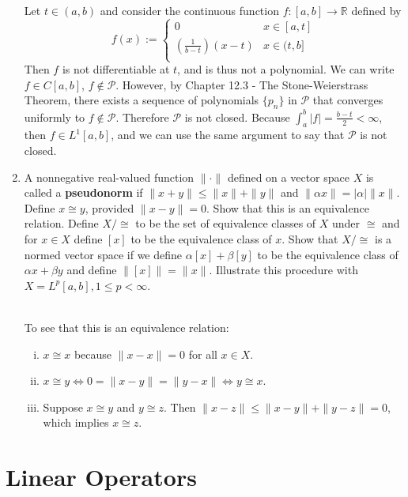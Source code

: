 \begin{enumerate}
    Let $t\in(a,b)$ and consider the continuous function $f:[a,b]\to\mathbb{R}$ defined by
    \[
        f(x):=
        \begin{cases}
            0 &x\in[a, t]\\
            (\frac{1}{b-t})(x-t)&x\in(t,b]\\
        \end{cases}
    \]
    Then $f$ is not differentiable at $t$, and is thus not a polynomial.
    We can write $f\in C[a,b]$, $f\notin\mathcal{P}$.
    However, by Chapter 12.3 - The Stone-Weierstrass Theorem, there exists a sequence of polynomials $\{p_n\}$ in $\mathcal{P}$ that converges uniformly to $f\notin\mathcal{P}$.
    Therefore $\mathcal{P}$ is not closed.
    Because $\int_a^b|f|=\frac{b-t}{2}<\infty$, then $f\in L^1[a,b]$, and we can use the same argument to say that $\mathcal{P}$ is not closed.
    \ \\\item A nonnegative real-valued function $\|\cdot\|$ defined on a vector space $X$ is called a \textbf{pseudonorm} if $\|x+y\|\le\|x\|+\|y\|$ and $\|\alpha x\|=|\alpha|\|x\|$.
    Define $x\cong y$, provided $\|x-y\|=0$.
    Show that this is an equivalence relation.
    Define $X/\cong$ to be the set of equivalence classes of $X$ under $\cong$ and for $x\in X$ define $[x]$ to be the equivalence class of $x$.
    Show that $X/\cong$ is a normed vector space if we define $\alpha[x]+\beta[y]$ to be the equivalence class of $\alpha x+\beta y$ and define $\|[x]\|=\|x\|$.
    Illustrate this procedure with $X=L^p[a,b],1\le p<\infty$.

    \ \\To see that this is an equivalence relation:
    \begin{enumerate}[(i)]
        \item $x\cong x$ because $\|x-x\|=0$ for all $x\in X$.
        \item $x\cong y\iff0=\|x-y\|=\|y-x\|\iff y\cong x$.
        \item Suppose $x\cong y$ and $y\cong z$. 
        Then $\|x-z\|\le\|x-y\|+\|y-z\|=0$, which implies $x\cong z$.
    \end{enumerate}
\end{enumerate}

\section{Linear Operators}

